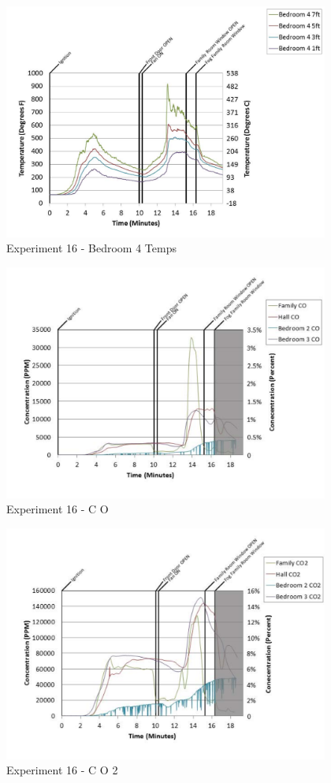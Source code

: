 \documentclass{article}
\begin{document}
\begin{appendices}
	\begin{figure}[h!]
		\centering
		\includegraphics[height=3.05in]{0_Images/Results_Charts/Exp_16_Charts/Bedroom4Temps.pdf}
		\caption{Experiment 16 - Bedroom 4 Temps}
	\end{figure}
 
	\clearpage

	\begin{figure}[h!]
		\centering
		\includegraphics[height=3.05in]{0_Images/Results_Charts/Exp_16_Charts/CO.pdf}
		\caption{Experiment 16 - C O}
	\end{figure}
 

	\begin{figure}[h!]
		\centering
		\includegraphics[height=3.05in]{0_Images/Results_Charts/Exp_16_Charts/CO2.pdf}
		\caption{Experiment 16 - C O 2}
	\end{figure}
 

\end{appendices}
\end{document}
